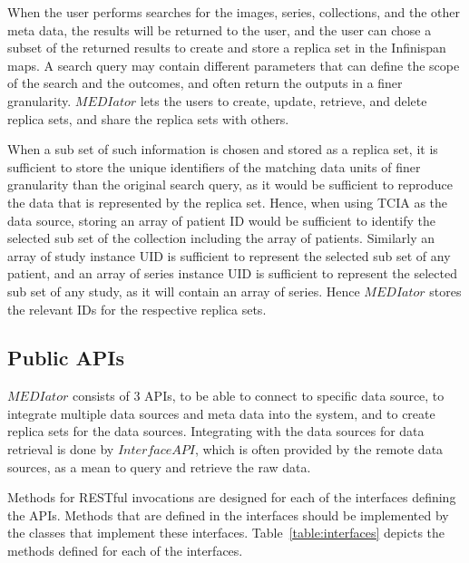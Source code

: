 \documentclass[conference]{IEEEtran}
\begin{document}
When the user performs searches for the images, series, collections, and the other meta data, the results will be returned to the user, and the user can chose a subset of the returned results to create and store a replica set in  the Infinispan maps. A search query may contain different parameters that can define the scope of the search and the outcomes, and often return the outputs in a finer granularity. $MEDIator$ lets the users to create, update, retrieve, and delete replica sets, and share the replica sets with others.

When a sub set of such information is chosen and stored as a replica set, it is sufficient to store the unique identifiers of the matching data units of finer granularity than the original search query, as it would be sufficient to reproduce the data that is represented by the replica set. Hence, when using TCIA as the data source, storing an array of patient ID would be sufficient to identify the selected sub set of the collection including the array of patients. Similarly an array of study instance UID is sufficient to represent the selected sub set of any patient, and an array of series instance UID is sufficient to represent the selected sub set of any study, as it will contain an array of series. Hence $MEDIator$ stores the relevant IDs for the respective replica sets.

\subsection{Public APIs}
$MEDIator$ consists of 3 APIs, to be able to connect to specific data source, to integrate multiple data sources and meta data into the system, and to create replica sets for the data sources. Integrating with the data sources for data retrieval is done by $InterfaceAPI$, which is often provided by the remote data sources, as a mean to query and retrieve the raw data.

Methods for RESTful invocations are designed for each of the interfaces defining the APIs. Methods that are defined in the interfaces should be implemented by the classes that implement these interfaces. Table~\ref{table:interfaces} depicts the methods defined for each of the interfaces.
\end{document}
